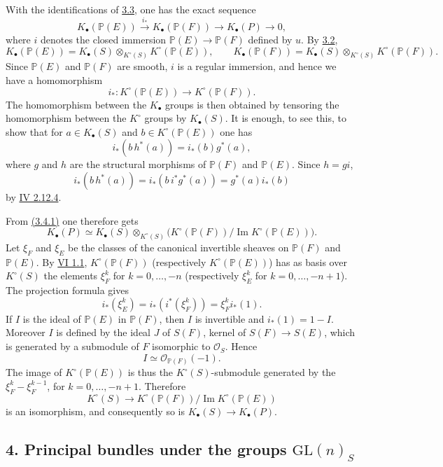 With the identifications of \hyperlink{sga6.e09.para.3-3}{3.3}, one has the exact sequence
\[
 K_\bullet(\mathbb P(E))\xrightarrow{i_*}K_\bullet(\mathbb P(F))\longrightarrow K_\bullet(P)\longrightarrow 0,
\tag{3.4.1}
\]
where $i$ denotes the closed immersion $\mathbb P(E)\to\mathbb P(F)$ defined by $u$. By \hyperlink{sga6.e09.cor.3-2}{3.2},
\[
 K_\bullet(\mathbb P(E))=K_\bullet(S)\otimes_{K^\circ(S)}K^\circ(\mathbb P(E)),
\qquad
 K_\bullet(\mathbb P(F))=K_\bullet(S)\otimes_{K^\circ(S)}K^\circ(\mathbb P(F)).
\]
Since $\mathbb P(E)$ and $\mathbb P(F)$ are smooth, $i$ is a regular immersion, and hence we have a homomorphism
\[
 i_*:K^\circ(\mathbb P(E))\longrightarrow K^\circ(\mathbb P(F)).
\]
The homomorphism between the $K_\bullet$ groups is then obtained by tensoring the homomorphism between the $K^\circ$ groups by $K_\bullet(S)$. It is enough, to see this, to show that for $a\in K_\bullet(S)$ and $b\in K^\circ(\mathbb P(E))$ one has
\[
 i_*(b\,h^*(a))=i_*(b)g^*(a),
\]
where $g$ and $h$ are the structural morphisms of $\mathbb P(F)$ and $\mathbb P(E)$. Since $h=gi$,
\[
 i_*(b\,h^*(a))=i_*(b\,i^*g^*(a))=g^*(a)i_*(b)
\]
by \hyperlink{sga6.e04.eq.2-12-4}{IV 2.12.4}.

From \hyperlink{sga6.e09.eq.3-4-1}{(3.4.1)} one therefore gets
\[
 K_\bullet(P)\simeq K_\bullet(S)\otimes_{K^\circ(S)}
 \bigl(K^\circ(\mathbb P(F))/\operatorname{Im}K^\circ(\mathbb P(E))\bigr).
\]
Let $\xi_F$ and $\xi_E$ be the classes of the canonical invertible sheaves on $\mathbb P(F)$ and $\mathbb P(E)$. By \hyperlink{sga6.e06.thm.1-1}{VI 1.1}, $K^\circ(\mathbb P(F))$ (respectively $K^\circ(\mathbb P(E))$) has as basis over $K^\circ(S)$ the elements $\xi_F^k$ for $k=0,\ldots,-n$ (respectively $\xi_E^k$ for $k=0,\ldots,-n+1$). The projection formula gives
\[
 i_*(\xi_E^k)=i_*(i^*(\xi_F^k))=\xi_F^k i_*(1).
\]
If $I$ is the ideal of $\mathbb P(E)$ in $\mathbb P(F)$, then $I$ is invertible and $i_*(1)=1-I$. Moreover $I$ is defined by the ideal $J$ of $S(F)$, kernel of $S(F)\to S(E)$, which is generated by a submodule of $F$ isomorphic to $\mathcal O_S$. Hence
\[
 I\simeq \mathcal O_{\mathbb P(F)}(-1).
\]
The image of $K^\circ(\mathbb P(E))$ is thus the $K^\circ(S)$-submodule generated by the $\xi_F^k-\xi_F^{k-1}$, for $k=0,\ldots,-n+1$. Therefore
\[
 K^\circ(S)\longrightarrow K^\circ(\mathbb P(F))/\operatorname{Im}K^\circ(\mathbb P(E))
\]
is an isomorphism, and consequently so is $K_\bullet(S)\to K_\bullet(P)$.

\subsection*{4. Principal bundles under the groups $\mathrm{GL}(n)_S$}

